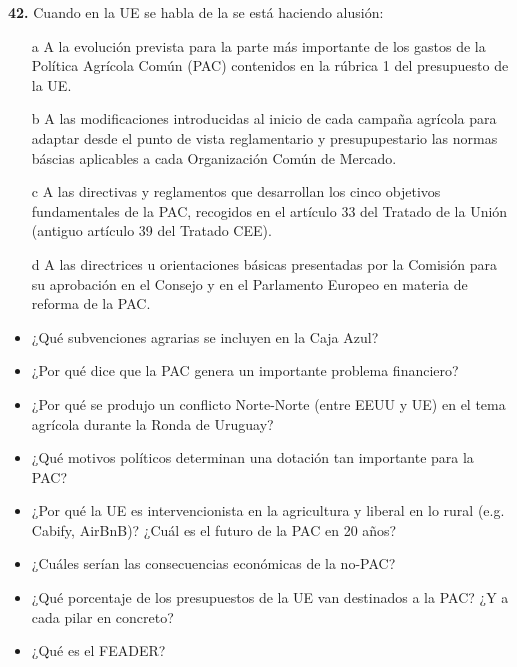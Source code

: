 \documentclass{nuevotema}
\begin{document}
\textbf{42.}
Cuando en la UE se habla de la  se está haciendo alusión:
\begin{enumerate}
    \item[a] A la evolución prevista para la parte más importante de los gastos de la Política Agrícola Común (PAC) contenidos en la rúbrica 1 del presupuesto de la UE.
    \item[b] A las modificaciones introducidas al inicio de cada campaña agrícola para adaptar desde el punto de vista reglamentario y presupupestario las normas báscias aplicables a cada Organización Común de Mercado.
    \item[c] A las directivas y reglamentos que desarrollan los cinco objetivos fundamentales de la PAC, recogidos en el artículo 33 del Tratado de la Unión (antiguo artículo 39 del Tratado CEE).
    \item[d] A las directrices u orientaciones básicas presentadas por la Comisión para su aprobación en el Consejo y en el Parlamento Europeo en materia de reforma de la PAC.
\end{enumerate}

\begin{itemize}
    \item ¿Qué subvenciones agrarias se incluyen en la Caja Azul?
    \item ¿Por qué dice que la PAC genera un importante problema financiero?
    \item ¿Por qué se produjo un conflicto Norte-Norte (entre EEUU y UE) en el tema agrícola durante la Ronda de Uruguay?
    \item ¿Qué motivos políticos determinan una dotación tan importante para la PAC?
    \item ¿Por qué la UE es intervencionista en la agricultura y liberal en lo rural (e.g. Cabify, AirBnB)? ¿Cuál es el futuro de la PAC en 20 años?
    \item ¿Cuáles serían las consecuencias económicas de la no-PAC?
    \item ¿Qué porcentaje de los presupuestos de la UE van destinados a la PAC? ¿Y a cada pilar en concreto? 
    \item ¿Qué es el FEADER?
\end{itemize}
\end{document}
